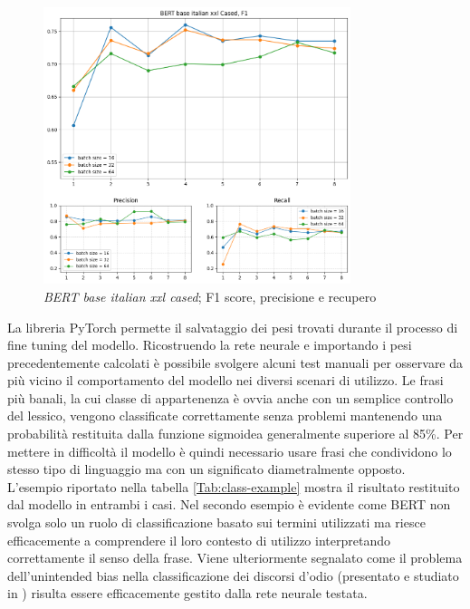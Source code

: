     \begin{figure}[h!]
        \centering
        \includegraphics[width=0.8\textwidth]{pics/bert base italian xxl cased/f1 precision recall xxl.png}
        \caption{\textit{BERT base italian xxl cased}; F1 score, precisione e recupero}
        \label{fig:f1-xxl}
    \end{figure}
    
    La libreria PyTorch permette il salvataggio dei pesi trovati durante il processo di fine tuning del modello. Ricostruendo la rete neurale e importando i pesi precedentemente calcolati è possibile svolgere alcuni test manuali per osservare da più vicino il comportamento del modello nei diversi scenari di utilizzo. Le frasi più banali, la cui classe di appartenenza è ovvia anche con un semplice controllo del lessico, vengono classificate correttamente senza problemi mantenendo una probabilità restituita dalla funzione sigmoidea generalmente superiore al 85\%. Per mettere in difficoltà il modello è quindi necessario usare frasi che condividono lo stesso tipo di linguaggio ma con un significato diametralmente opposto. L'esempio riportato nella tabella \ref{Tab:class-example} mostra il risultato restituito dal modello in entrambi i casi. Nel secondo esempio è evidente come BERT non svolga solo un ruolo di classificazione basato sui termini utilizzati ma riesce efficacemente a comprendere il loro contesto di utilizzo interpretando correttamente il senso della frase. Viene ulteriormente segnalato come il problema dell'unintended bias nella classificazione dei discorsi d'odio (presentato e studiato in \cite{FersiniBias}) risulta essere efficacemente gestito dalla rete neurale testata.
    
